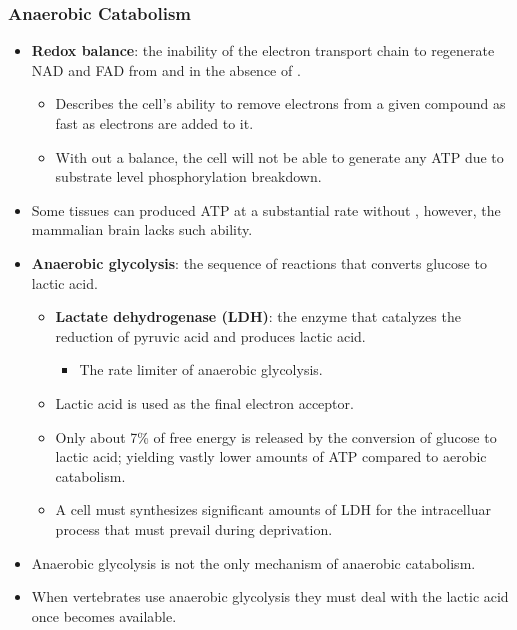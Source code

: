 \documentclass[12pt,a4paper]{article}
\begin{document}
\begin{itemize}
    \subsubsection{Anaerobic Catabolism}
    \begin{itemize}
        \item \textbf{Redox balance}: the inability of the electron transport chain to regenerate NAD and FAD from  and  in the absence of .
            \begin{itemize}
                \item Describes the cell's ability to remove electrons from a given compound as fast as electrons are added to it.
                \item With out a balance, the cell will not be able to generate any ATP due to substrate level phosphorylation breakdown.
            \end{itemize}
        \item Some tissues can produced ATP at a substantial rate without , however, the mammalian brain lacks such ability.
        \item \textbf{Anaerobic glycolysis}: the sequence of reactions that converts glucose to lactic acid.
            \begin{itemize}
                \item \textbf{Lactate dehydrogenase (LDH)}: the enzyme that catalyzes the reduction of pyruvic acid and produces lactic acid.
                    \begin{itemize}
                        \item The rate limiter of anaerobic glycolysis.
                    \end{itemize}
                \item Lactic acid is used as the final electron acceptor. 
                \item Only about 7\% of free energy is released by the conversion of glucose to lactic acid; yielding vastly lower amounts of ATP compared to aerobic catabolism.
                \item A cell must synthesizes significant amounts of LDH for the intracelluar process that must prevail during  deprivation.
            \end{itemize}
        \item Anaerobic glycolysis is not the only mechanism of anaerobic catabolism.
        \item When vertebrates use anaerobic glycolysis they must deal with the lactic acid once  becomes available.

\end{itemize}
\end{itemize}
\end{document}
